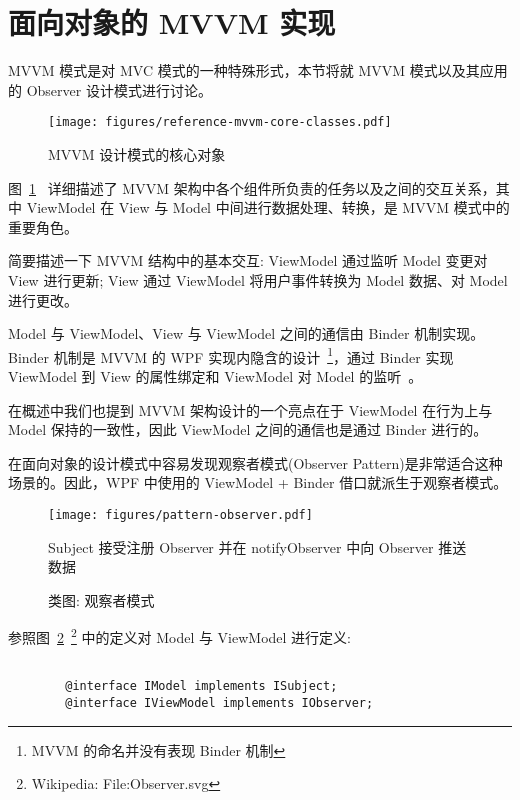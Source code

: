 \section{面向对象的 MVVM 实现}

MVVM 模式是对 MVC 模式的一种特殊形式，本节将就 MVVM 模式以及其应用的 Observer 设计模式进行讨论。

\begin{figure}[!h]
  \begin{center}
    \texttt{[image: figures/reference-mvvm-core-classes.pdf]}
    \caption{MVVM 设计模式的核心对象\label{MVVMCoreClasses}}
  \end{center}
\end{figure}

图~\ref{MVVMCoreClasses}~\cite{ghoda2012windows} 详细描述了 MVVM 架构中各个组件所负责的任务以及之间的交互关系，其中 ViewModel 在 View 与 Model 中间进行数据处理、转换，是 MVVM 模式中的重要角色。

简要描述一下 MVVM 结构中的基本交互: ViewModel 通过监听 Model 变更对 View 进行更新; View 通过 ViewModel 将用户事件转换为 Model 数据、对 Model 进行更改。

Model 与 ViewModel、View 与 ViewModel 之间的通信由 Binder 机制实现。Binder 机制是 MVVM 的 WPF 实现内隐含的设计~\footnote{MVVM 的命名并没有表现 Binder 机制}，通过 Binder 实现 ViewModel 到 View 的属性绑定和 ViewModel 对 Model 的监听~\cite{Likness2010}。

在概述中我们也提到 MVVM 架构设计的一个亮点在于 ViewModel 在行为上与 Model 保持的一致性，因此 ViewModel 之间的通信也是通过 Binder 进行的。

在面向对象的设计模式中容易发现观察者模式(Observer Pattern)是非常适合这种场景的。因此，WPF 中使用的 ViewModel + Binder 借口就派生于观察者模式。

\begin{figure}[!h]
  \begin{center}
    \texttt{[image: figures/pattern-observer.pdf]}
    \caption{类图: 观察者模式\label{PatternObserver}}
    Subject 接受注册 Observer 并在 notifyObserver 中向 Observer 推送数据
  \end{center}
\end{figure}

参照图~\ref{PatternObserver}~\footnote{Wikipedia: File:Observer.svg} 中的定义对 Model 与 ViewModel 进行定义:

\begin{verbatim}

        @interface IModel implements ISubject;
        @interface IViewModel implements IObserver;

\end{verbatim}

